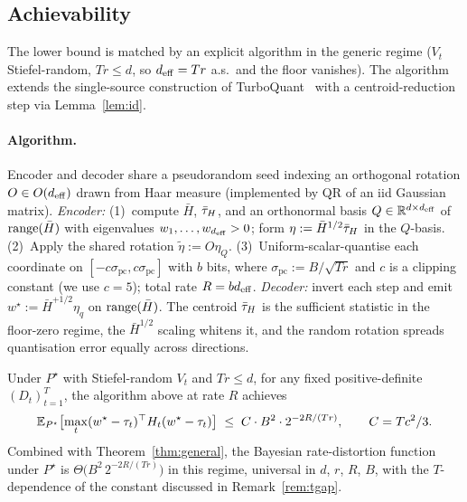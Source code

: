 \subsection{Achievability}
\label{app:rd-achv}

The lower bound is matched by an explicit algorithm in the generic
regime ($V_t$ Stiefel-random, $Tr \leq d$, so $d_{\mathrm{eff}} = Tr$ a.s.\ and
the floor vanishes). The algorithm extends the single-source
construction of TurboQuant~\citep{zandieh2025turboquant} with a
centroid-reduction step via Lemma~\ref{lem:id}.

\paragraph{Algorithm.}\label{subsec:alg}\label{subsec:rd-encoder-impl}
Encoder and decoder share a pseudorandom seed indexing an orthogonal
rotation $O \in O(d_{\mathrm{eff}})$ drawn from Haar measure (implemented by QR of
an iid Gaussian matrix). \emph{Encoder:} (1)~compute $\bar H$, $\bar{\tau}_H$,
and an orthonormal basis $Q \in \mathbb{R}^{d\times d_{\mathrm{eff}}}$ of $\operatorname{range}(\bar H)$
with eigenvalues $w_1,\ldots,w_{d_{\mathrm{eff}}} > 0$; form $\eta := \bar
H^{1/2}\bar{\tau}_H$ in the $Q$-basis. (2)~Apply the shared rotation
$\tilde\eta := O\eta_Q$. (3)~Uniform-scalar-quantise each coordinate on
$[-c\sigma_{\mathrm{pc}}, c\sigma_{\mathrm{pc}}]$ with $b$ bits, where
$\sigma_{\mathrm{pc}} := B/\sqrt{Tr}$ and $c$ is a clipping constant
(we use $c = 5$); total rate $R = bd_{\mathrm{eff}}$. \emph{Decoder:} invert each
step and emit $w^\star := \bar H^{+1/2}\eta_q$ on $\operatorname{range}(\bar H)$. The
centroid $\bar{\tau}_H$ is the sufficient statistic in the floor-zero regime,
the $\bar H^{1/2}$ scaling whitens it, and the random rotation spreads
quantisation error equally across directions.

\begin{theorem}\label{thm:achv}
Under $P^\star$ with Stiefel-random $V_t$ and $Tr\leq d$, for any fixed
positive-definite $(D_t)_{t=1}^T$, the algorithm above at rate $R$
achieves
\begin{equation}\label{eq:thm-ub}
  \mathbb{E}_{P^\star}\bigl[\max_t(w^\star-\tau_t)^\top H_t(w^\star-
  \tau_t)\bigr]
  \;\leq\; C\cdot B^2 \cdot 2^{-2R/(Tr)},
  \qquad C = Tc^2/3.
\end{equation}
Combined with Theorem~\ref{thm:general}, the Bayesian rate-distortion
function under $P^\star$ is $\Theta\bigl(B^2\, 2^{-2R/(Tr)}\bigr)$ in
this regime, universal in $d$, $r$, $R$, $B$, with the
$T$-dependence of the constant discussed in Remark~\ref{rem:tgap}.
\end{theorem}


